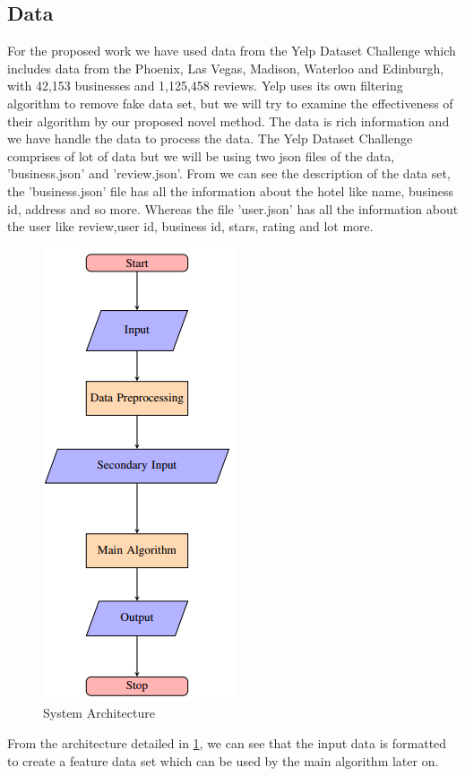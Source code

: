\documentclass[sigconf]{acmart}
\begin{document}
\subsection{Data}
For the proposed work we have used data from the Yelp Dataset Challenge which includes data from the Phoenix, Las Vegas, Madison, Waterloo and Edinburgh, with 42,153 businesses and 1,125,458 reviews. Yelp uses its own filtering algorithm to remove fake data set, but we will try to examine the effectiveness of their algorithm by our proposed novel method. The data is rich information and we have handle the data to process the data. The Yelp Dataset Challenge comprises of lot of data but we will be using two json files of the data, 'business.json' and 'review.json'.  From \cite{yelpdatasetchalleng} we can see the description of the data set, the 'business.json' file has all the information about the hotel like name, business id, address and so more. Whereas the file 'user.json' has all the information about the user like review,user id, business id, stars, rating and lot more.
\begin{figure}
  \centering\includegraphics[scale=1.0]{images/Capture.png}
  \caption{System Architecture \cite{originalPaper}}\label{f:archi}
\end{figure}

From the architecture detailed in \ref{f:archi}, we can see that the input data is formatted to create a feature data set which can be used by the main algorithm later on.
\end{document}
